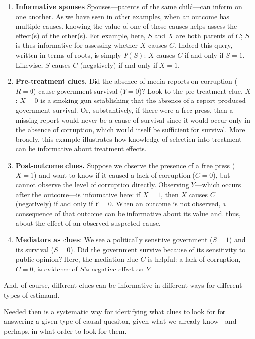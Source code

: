 \documentclass[
  12pt,
]{book}
\begin{document}
\begin{enumerate}
\def\labelenumi{\arabic{enumi}.}
\item
  \textbf{Informative spouses} Spouses---parents of the same child---can inform on one another. As we have seen in other examples, when an outcome has multiple causes, knowing the value of one of those causes helps assess the effect(s) of the other(s). For example, here, \(S\) and \(X\) are both parents of \(C\); \(S\) is thus informative for assessing whether \(X\) causes \(C\). Indeed this query, written in terms of roots, is simply \(P(S)\): \(X\) causes \(C\) if and only if \(S=1\). Likewise, \(S\) causes \(C\) (negatively) if and only if \(X=1\).
\item
  \textbf{Pre-treatment clues.} Did the absence of media reports on corruption (\(R=0\)) cause government survival (\(Y=0\))? Look to the pre-treatment clue, \(X\): \(X=0\) is a smoking gun establishing that the absence of a report produced government survival. Or, substantively, if there were a free press, then a missing report would never be a cause of survival since it would occur only in the absence of corruption, which would itself be sufficient for survival. More broadly, this example illustrates how knowledge of selection into treatment can be informative about treatment effects.
\item
  \textbf{Post-outcome clues.} Suppose we observe the presence of a free press (\(X=1\)) and want to know if it caused a lack of corruption (\(C=0\)), but cannot observe the level of corruption directly. Observing \(Y\)---which occurs after the outcome---is informative here: if \(X=1\), then \(X\) causes \(C\) (negatively) if and only if \(Y=0\). When an outcome is not observed, a consequence of that outcome can be informative about its value and, thus, about the effect of an observed suspected cause.
\item
  \textbf{Mediators as clues}: We see a politically sensitive government (\(S=1\)) and its survival (\(S=0\)). Did the government survive because of its sensitivity to public opinion? Here, the mediation clue \(C\) is helpful: a lack of corruption, \(C=0\), is evidence of \(S\)'s negative effect on \(Y\).
\end{enumerate}

And, of course, different clues can be informative in different ways for different types of estimand.

Needed then is a systematic way for identifying what clues to look for for answering a given type of causal quesiton, given what we already know---and perhaps, in what order to look for them.
\end{document}
